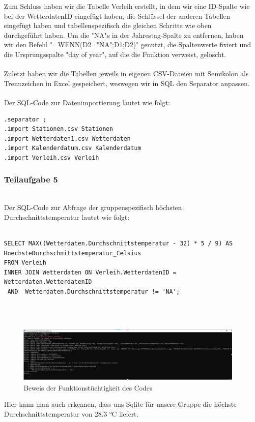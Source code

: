 \documentclass[a4paper,12pt]{article}
\begin{document}
Zum Schluss haben wir die Tabelle Verleih erstellt, in dem wir eine ID-Spalte wie bei der WetterdatenID eingefügt haben, die Schlüssel der anderen Tabellen eingefügt haben und tabellenspezifisch die gleichen Schritte wie oben durchgeführt haben. Um die "NA"s in der Jahrestag-Spalte zu entfernen, haben wir den Befehl "=WENN(D2="NA";D1;D2)" genutzt, die Spaltenwerte fixiert und die Ursprungsspalte "day of year", auf die die Funktion verweist, gelöscht.\\ \\
Zuletzt haben wir die Tabellen jeweils in eigenen CSV-Dateien mit Semikolon als Trennzeichen in Excel gespeichert, weswegen wir in SQL den Separator anpassen.\\ \\

\noindent Der SQL-Code zur Datenimportierung lautet wie folgt: \\ 

\begin{lstlisting}
.separator ;
.import Stationen.csv Stationen
.import Wetterdaten1.csv Wetterdaten 
.import Kalenderdatum.csv Kalenderdatum 
.import Verleih.csv Verleih 
\end{lstlisting}

\subsubsection{Teilaufgabe 5} \\ Der SQL-Code zur Abfrage der gruppenspezifisch höchsten Durchschnittstemperatur lautet wie folgt:\\ \\
\begin{lstlisting}
SELECT MAX((Wetterdaten.Durchschnittstemperatur - 32) * 5 / 9) AS  HoechsteDurchschnittstemperatur_Celsius
FROM Verleih 
INNER JOIN Wetterdaten ON Verleih.WetterdatenID = Wetterdaten.WetterdatenID
 AND  Wetterdaten.Durchschnittstemperatur != 'NA'; 
 \end{lstlisting}
\\ \\
\begin{figure}[H]
    \centering
    \includegraphics[width=\textwidth]{image.png}
    \caption{Beweis der Funktionstüchtigkeit des Codes}
    \label{fig:enter-label}
\end{figure}
\noindent Hier kann man auch erkennen, dass uns Sqlite für unsere Gruppe die höchste Durchschnittstemperatur von 28.3 °C liefert.
\end{document}
